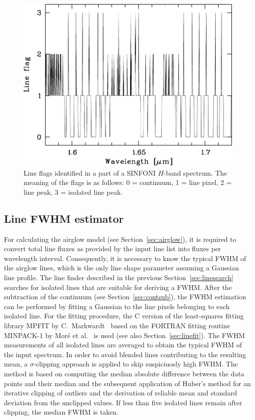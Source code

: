 \begin{figure}
\centering
\includegraphics[width=12cm,clip=true]{figures/scd_illlineflags.pdf}
\caption[]{Line flags identified in a part of a SINFONI $H$-band spectrum. The
meaning of the flags is as follows: 0 = continuum, 1 = line pixel,
2 = line peak, 3 = isolated line peak.}
\label{fig:lineflags}
\end{figure}

\subsection{Line FWHM estimator}\label{sec:FWHM}
For calculating the airglow model (see Section~\ref{sec:airglow}), it is
required to convert total line fluxes as provided by the input line list into
fluxes per wavelength interval. Consequently, it is necessary to know the
typical FWHM of the airglow lines, which is the only line shape parameter
assuming a Gaussian line profile. The line finder described in the previous
Section~\ref{sec:linesearch} searches for isolated lines that are suitable for
deriving a FWHM. After the subtraction of the continuum (see
Section~\ref{sec:contsub}), the FWHM estimation can be performed by fitting a
Gaussian to the line pixels belonging to each isolated line. For the fitting
procedure, the C version of the least-squares fitting library MPFIT by
C.~Markwardt~\cite{CMPFIT} based on the FORTRAN fitting routine MINPACK-1 by
Mor\'e et al.~\cite{MOR80} is used (see also Section~\ref{sec:linefit}).
The FWHM measurements of all isolated lines are averaged to obtain the typical
FWHM of the input spectrum. In order to avoid blended lines contributing to
the resulting mean, a $\sigma$-clipping approach is applied to skip
suspiciuosly high FWHM. The method is based on computing the median absolute
difference between the data points and their median and the subsequent
application of Huber's method for an iterative clipping of outliers
\cite{huber} and the derivation of reliable mean and standard deviation from
the unclipped values. If less than five isolated lines remain after clipping,
the median FWHM is taken.

